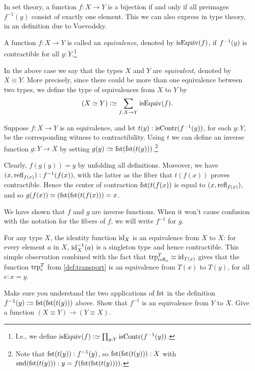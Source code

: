 In set theory, a function $f : X \to Y$ is a bijection if and only if
all preimages $f^{-1}(y)$ consist of exactly one element.
This we can also express in type theory, in an definition due
to Voevodsky. 

\begin{definition}
  \label{def:equivalence}
  A function $f : X \to Y$ is called an \emph{equivalence},
  denoted by $\isEq(f)$, if $f^{-1}(y)$ is contractible for
  all $y:Y$.\footnote{%
    I.e., we define $\isEq(f) \defeq \prod_{y:Y}\iscontr(f^{-1}(y))$.}
\end{definition}

In the above case we say that the types
$X$ and $Y$ are \emph{equivalent}, denoted by $X\equiv Y$. 
More precisely, since there could be more than one equivalence
between two types, we define the type of equivalences from $X$ to $Y$ by
\[
  (X\equiv Y) \defeq \sum_{f:X\to Y} \isEq(f).
\]

Suppose $f:X \to Y$ is an equivalence, and let $t(y): \iscontr(f^{-1}(y))$, for each $y:Y$, be the corresponding witness to contractibility.
Using $t$ we can define an inverse function $g : Y \to X$ by setting $g(y)\defeq\fst(\fst(t(y)))$.\footnote{%
  Note that $\fst(t(y)) : \inv f(y)$, so $\fst(\fst(t(y))) : X$ with
  $\snd(\fst(t(y))) : y = f(\fst(\fst(t(y)))).$}

Clearly, $f(g(y)) = y$ by unfolding all definitions.
Moreover, we have $(x,\mathrm{refl}_{f(x)}) : f^{-1}(f(x))$,
with the latter as the fiber that $t(f(x))$
proves contractible. Hence the center of contraction
$\fst(t(f(x))$ is equal to $(x,\mathrm{refl}_{f(x)})$, and so
$g(f(x))\jdeq(\fst(\fst(t(f(x))) = x$.

We have shown that $f$ and $g$ are inverse functions.  When it won't cause confusion with the notation for the fibers of $f$, we will write
$f^{-1}$ for $g$.

For any type $X$, the identity function $\mathord{\mathrm{id}}_X$ is an
equivalence from $X$ to $X$: for every element $a$ in $X$,
$\mathord{\mathrm{id}}_X^{-1}(a)$ is a singleton type and hence contractible.
This simple observation combined with the fact that
$\trp[T]{\refl{x}}\jdeq \id_{T(x)}$ gives that
the function $\trp[T]{e}$ from \cref{def:transport}
is an equivalence from $T(x)$ to $T(y)$, for all $e: x=y$.

\begin{xca}\label{xca:equivalence-invers}
Make sure you understand the two applications of $\fst$
in the definition $f^{-1}(y)\defeq\fst(\fst(t(y)))$ above.
Show that $f^{-1}$ is an equivalence from $Y$ to $X$.
Give a function $(X\equiv Y) \to (Y\equiv X)$.
\end{xca}

